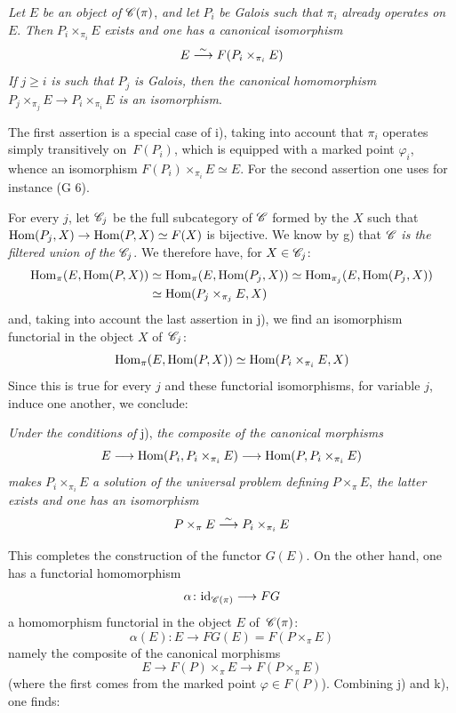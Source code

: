\begin{enumerateb}
\item[j)] \emph{Let} $E$ \emph{be an object of} $\cal{C}(\pi)$, \emph{and
let} $P_i$ \emph{be Galois such that} $\pi_i$ \emph{already
operates on} $E$. \emph{Then} $P_i \times_{\pi_i} E$
\emph{exists and one has a canonical isomorphism}
$$
E \overset{\sim}{\longrightarrow} F(P_i \times_{\pi_i} E)
$$
\emph{If} $j \geq i$ \emph{is such that} $P_j$ \emph{is Galois,
then the canonical homomorphism} $P_j \times_{\pi_j} E \to\allowbreak P_i
\times_{\pi_i} E$ \emph{is an isomorphism}.

The first assertion is a special case of i), taking into account
that $\pi_i$ operates simply transitively on~$F(P_i)$,
which is equipped with a marked point $\varphi_i$, whence an isomorphism
$F(P_i) \times_{\pi_i} E \simeq E$. For the second assertion one
uses for instance (G 6).

For every $j$, let $\cal{C}_j$ be the full subcategory of
$\cal{C}$ formed by the $X$ such that $\Hom(P_j,X) \to \Hom(P,X)
\simeq F(X)$ is bijective. We know by g) that $\cal{C}$ \emph{is
the filtered union of the} $\cal{C}_j$. We therefore have, for $X \in
\cal{C}_j$:
\begin{align*}
\operatorname{Hom}_{\pi}(E,\operatorname{Hom}(P,X)) & \simeq \operatorname{Hom}_{\pi}(E,\operatorname{Hom}(P_j,X)) \simeq
\operatorname{Hom}_{\pi_j}(E,\operatorname{Hom}(P_j,X))\\ & \simeq \operatorname{Hom}(P_j \times_{\pi_j} E,X)
\end{align*}
and,
taking into account the last assertion in j), we find an
isomorphism functorial in the object $X$ of~$\cal{C}_j$:
$$
\operatorname{Hom}_{\pi}(E,\operatorname{Hom}(P,X)) \simeq \operatorname{Hom}(P_i \times_{\pi_i} E,X)
$$
Since this is true for every $j$ and these functorial isomorphisms,
for variable $j$, induce one another, we conclude:

\item[k)] \emph{Under the conditions of} j), \emph{the composite
of the canonical morphisms}
$$
E \to \Hom(P_i,P_i \times_{\pi_i} E) \to \Hom(P,P_i \times_{\pi_i} E)
$$
\emph{makes} $P_i \times_{\pi_i} E$ \emph{a solution of the
universal problem defining} $P \times_{\pi} E$,
\ie \emph{the latter exists and one has an isomorphism}
$$
P \times_{\pi} E \overset{\sim}{\longrightarrow} P_i \times_{\pi_i} E
$$

This completes the construction of the functor $G(E)$. On the other hand, one has
a functorial homomorphism
$$
\alpha \colon \id_{\cal{C}(\pi)} \to FG
$$
\ie a homomorphism functorial in the object $E$ of~$\cal{C}(\pi)$:
$$
\alpha(E) \colon E \to FG(E) = F(P \times_{\pi} E)
$$
namely the composite of the canonical morphisms
$$
E \to F(P) \times_{\pi} E \to F(P \times_{\pi} E)
$$
(where the first comes from the marked point $\varphi \in F(P)$).
Combining j) and k), one finds:


\end{enumerateb}
